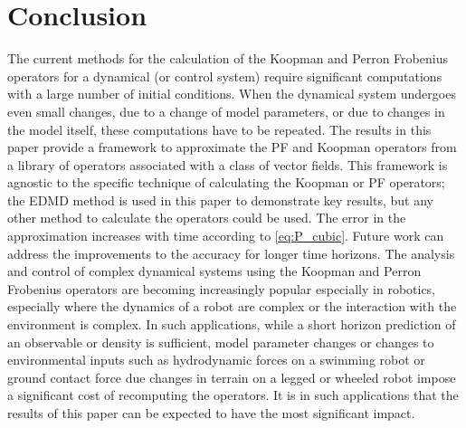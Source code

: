 \documentclass[pdflatex,sn-mathphys]{sn-jnl}%
\theoremstyle{thmstyleone}%
\theoremstyle{thmstyletwo}%
\theoremstyle{thmstylethree}%
\begin{document}
\section{Conclusion}
The current methods for the calculation of the Koopman and Perron Frobenius operators for a dynamical (or control system) require significant computations with a large number of initial conditions. When the dynamical system undergoes even small changes, due to a change of model parameters, or due to changes in the model itself, these computations have to be repeated. The results in this paper provide a framework to approximate the PF and Koopman operators from a library of operators associated with a class of vector fields. This framework is agnostic to the specific technique of calculating the Koopman or PF operators; the EDMD method is used in this paper to demonstrate key results, but any other method to calculate the operators could be used. The error in the approximation increases with time according to \eqref{eq:P_cubic}. Future work can address the improvements to the accuracy for longer time horizons. The analysis and control of complex dynamical systems using the Koopman and Perron Frobenius operators are becoming increasingly popular especially in robotics, especially where the dynamics of a robot are complex or the interaction with the environment is complex. In such applications, while a short horizon prediction of an observable or density is sufficient, model parameter changes or changes to environmental inputs such as hydrodynamic forces on a swimming robot or ground contact force due changes in terrain on a legged or wheeled robot impose a significant cost of recomputing the operators. It is in such applications that the results of this paper can be expected to have the most significant impact.



\end{document}
